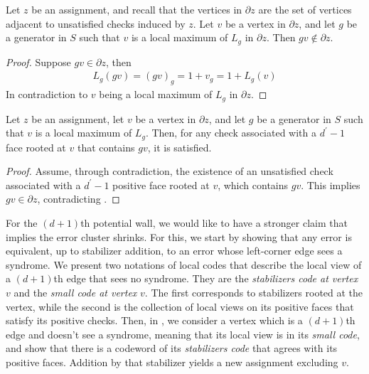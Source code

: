 \begin{claim}
  \label{claim:localmax}
Let $z$ be an assignment, and recall that the vertices in $\partial z$ are the set of vertices adjacent to unsatisfied checks induced by $z$. Let $v$ be a vertex in $\partial z$, and let $g$ be a generator in $S$ such that $v$ is a local maximum of $L_{g}$ in $\partial z$. Then $gv \notin \partial z$.
\end{claim}
\begin{proof}
  Suppose $gv \in \partial z$, then 
  \begin{equation*}
    \begin{split}
      L_{g}(gv) = (gv)_{g} = 1 + v_{g} = 1 + L_{g}(v)
    \end{split}
  \end{equation*}
In contradiction to $v$ being a local maximum of $L_{g}$ in $\partial z$.
\end{proof}
\begin{claim}
  \label{claim:edge_pole}
Let $z$ be an assignment, let $v$ be a vertex in $\partial z$, and let $g$ be a generator in $S$ such that $v$ is a local maximum of $L_{g}$. Then, for any check associated with a $d^{\prime}-1$ face rooted at $v$ that contains $gv$, it is satisfied.
\end{claim}
\begin{proof}
Assume, through contradiction, the existence of an unsatisfied check associated with a $d^{\prime}-1$ positive face rooted at $v$, which contains $gv$. This implies $gv \in \partial z$, contradicting .
\end{proof}

For the $(d+1)$th potential wall, we would like to have a stronger claim that implies the error cluster shrinks. For this, we start by showing that any error is equivalent, up to stabilizer addition, to an error whose left-corner edge sees a syndrome. We present two notations of local codes that describe the local view of a $(d+1)$th edge that sees no syndrome. They are the \textit{stabilizers code at vertex} $v$ and the \textit{small code at vertex} $v$. The first corresponds to stabilizers rooted at the vertex, while the second is the collection of local views on its positive faces that satisfy its positive checks. Then, in , we consider a vertex which is a $(d+1)$th edge and doesn't see a syndrome, meaning that its local view is in its \textit{small code}, and show that there is a codeword of its \textit{stabilizers code} that agrees with its positive faces. Addition by that stabilizer yields a new assignment excluding $v$.

